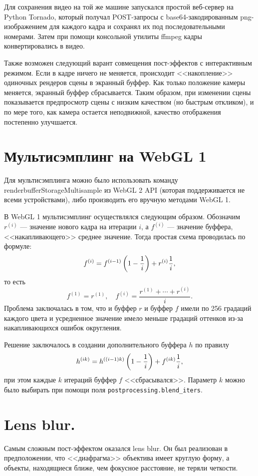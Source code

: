 Для сохранения видео на той же машине запускался простой веб-сервер на Python Tornado, который получал POST-запросы с base64-закодированным png-изображением для каждого кадра и сохранял их под последовательными номерами. Затем при помощи консольной утилиты ffmpeg кадры конвертировались в видео.

Также возможен следующий варант совмещения пост-эффектов с интерактивным режимом. Если в кадре ничего не меняется, происходит <<накопление>> одиночных рендеров сцены в экранный буффер. Как только положение камеры меняется, экранный буффер сбрасывается. Таким образом, при изменении сцены показывается предпросмотр сцены с низким качеством (но быстрым откликом), и по мере того, как камера остается неподвижной, качество отображения постепенно улучшается. 

\section{Мультисэмплинг на WebGL 1}

Для мультисэмплинга можно было использовать команду renderbufferStorageMultisample из WebGL 2 API (которая поддерживается не всеми устройствами), либо производить его вручную методами WebGL 1.

В WebGL 1 мультисэмплинг осуществлялся следующим образом. Обозначим $r^{(i)}$ --- значение нового кадра на итерации $i$, а $f^{(i)}$ --- значение буффера, <<накапливающего>> среднее значение. Тогда простая схема проводилась по формуле:
$$f^{(i)} = f^{(i-1)} \left(1 - \frac{1}{i}\right) + r^{(i)} \frac{1}{i},$$
то есть
$$f^{(1)} = r^{(1)},\quad f^{(i)} = \frac{r^{(1)} + \cdots + r^{(i)}}{i}.$$
Проблема заключалась в том, что и буффер $r$ и буффер $f$ имели по 256 градаций каждого цвета и усредненное значение имело меньше градаций оттенков из-за накапливающихся ошибок округления.

Решение заключалось в создании дополнительного буффера $h$ по правилу
$$h^{(ik)} = h^{((i - 1)k)} \left(1 - \frac{1}{i}\right) + f^{(ik)}\frac{1}{i},$$
при этом каждые $k$ итераций буффер $f$ <<сбрасывался>>.
Параметр $k$ можно было выбирать при помощи поля \texttt{postprocessing.blend\_iters}.

\section{Lens blur.}

Самым сложным пост-эффектом оказался lens blur. Он был реализован в предположении, что <<диафрагма>> объектива имеет круглую форму, а объекты, находящиеся ближе, чем фокусное расстояние, не теряли четкости.

